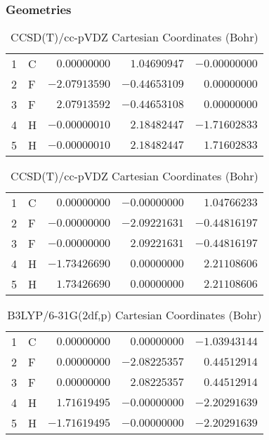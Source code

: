 \documentclass[10pt,oneside]{article}
\begin{document}
\begin{table}[h!]
\subsubsection*{Geometries}
\begin{multicols}{2}
\centering
\caption{CCSD(T)/cc-pVTZ Cartesian Coordinates (Bohr)}
\begin{tabular}{llrrr}
\toprule
1  & C  & $ 0.00000000$ & $ 1.04690947$ & $-0.00000000$ \\
2  & F  & $-2.07913590$ & $-0.44653109$ & $ 0.00000000$ \\
3  & F  & $ 2.07913592$ & $-0.44653108$ & $ 0.00000000$ \\
4  & H  & $-0.00000010$ & $ 2.18482447$ & $-1.71602833$ \\
5  & H  & $-0.00000010$ & $ 2.18482447$ & $ 1.71602833$ \\
\bottomrule
\end{tabular}
\caption{CCSD(T)/cc-pVDZ Cartesian Coordinates (Bohr)}
\begin{tabular}{llrrr}
\toprule
1  & C  & $ 0.00000000$ & $-0.00000000$ & $ 1.04766233$ \\
2  & F  & $-0.00000000$ & $-2.09221631$ & $-0.44816197$ \\
3  & F  & $-0.00000000$ & $ 2.09221631$ & $-0.44816197$ \\
4  & H  & $-1.73426690$ & $ 0.00000000$ & $ 2.21108606$ \\
5  & H  & $ 1.73426690$ & $ 0.00000000$ & $ 2.21108606$ \\
\bottomrule
\end{tabular}
\end{multicols}
\end{table}

\begin{table}[h]
\centering
\caption{B3LYP/6-31G(2df,p) Cartesian Coordinates (Bohr)}
\begin{tabular}{llrrr}
\toprule
1  & C  & $ 0.00000000$ & $ 0.00000000$ & $-1.03943144$ \\
2  & F  & $ 0.00000000$ & $-2.08225357$ & $ 0.44512914$ \\
3  & F  & $ 0.00000000$ & $ 2.08225357$ & $ 0.44512914$ \\
4  & H  & $ 1.71619495$ & $-0.00000000$ & $-2.20291639$ \\
5  & H  & $-1.71619495$ & $-0.00000000$ & $-2.20291639$ \\
\bottomrule
\end{tabular}
\end{table}
\end{document}
